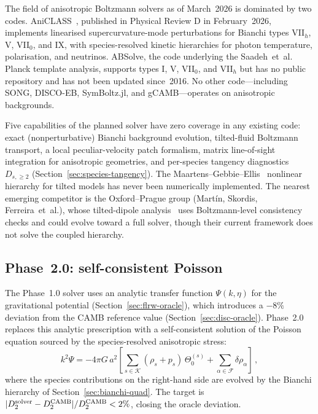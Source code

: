 The field of anisotropic Boltzmann solvers as of
March~2026 is dominated by two codes.
AniCLASS~\cite{VicentePereiraPitrou2026}, published in
Physical Review D in February~2026, implements linearised
supercurvature-mode perturbations for Bianchi types
VII$_h$, V, VII$_0$, and IX, with species-resolved kinetic
hierarchies for photon temperature, polarisation, and
neutrinos.  ABSolve, the code underlying the
Saadeh~et~al.~\cite{Saadeh2016b} Planck template analysis,
supports types I, V, VII$_0$, and VII$_h$ but has no public
repository and has not been updated since~2016.  No other
code---including SONG, DISCO-EB, SymBoltz.jl, and
gCAMB---operates on anisotropic backgrounds.

Five capabilities of the planned solver have zero coverage
in any existing code:
exact (nonperturbative) Bianchi background evolution,
tilted-fluid Boltzmann transport,
a local peculiar-velocity patch formalism,
matrix line-of-sight integration for anisotropic
geometries, and per-species tangency diagnostics
$D_{s,\geq 2}$
(Section~\ref{sec:species-tangency}).  The
Maartens--Gebbie--Ellis~\cite{MaartensGE1999} nonlinear
hierarchy for tilted models has never been numerically
implemented.  The nearest emerging competitor is the
Oxford--Prague group (Mart{\'i}n, Skordis,
Ferreira~et~al.), whose tilted-dipole
analysis~\cite{MartinSkordis2025} uses Boltzmann-level
consistency checks and could evolve toward a full solver,
though their current framework does not solve the coupled
hierarchy.


\subsection{Phase~2.0: self-consistent Poisson}
\label{sec:phase20}

The Phase~1.0 solver uses an analytic transfer function
$\Psi(k, \eta)$ for the gravitational potential
(Section~\ref{sec:flrw-oracle}), which introduces a
$-8\%$ deviation from the CAMB reference value
(Section~\ref{sec:disc-oracle}).  Phase~2.0 replaces
this analytic prescription with a self-consistent
solution of the Poisson equation sourced by the
species-resolved anisotropic stress:
\begin{equation}\label{eq:poisson-sc}
k^2 \Psi = -4\pi G\, a^2
  \left[
  \sum_{s \in \mathcal{K}}
    (\rho_s + p_s)\, \Theta^{(s)}_0
  + \sum_{\alpha \in \mathcal{F}}
    \delta\rho_\alpha
  \right]\,,
\end{equation}
where the species contributions on the right-hand side
are evolved by the Bianchi hierarchy of
Section~\ref{sec:bianchi-quad}.  The target is
$|D_2^{\rm solver} - D_2^{\rm CAMB}| / D_2^{\rm CAMB}
< 2\%$, closing the oracle deviation.

